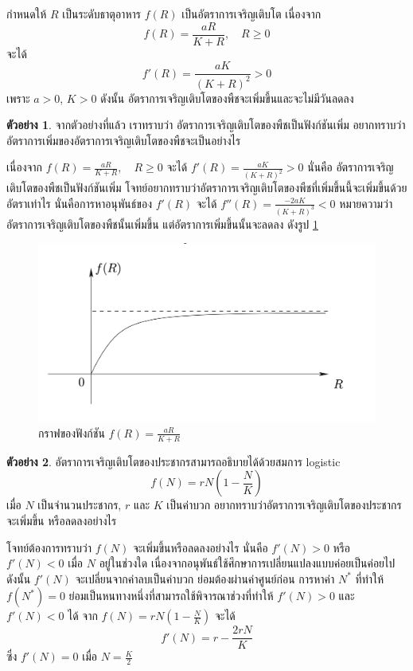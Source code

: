 \documentclass[
]{book}
\theoremstyle{definition}
\theoremstyle{definition}
\newtheorem{example}{ตัวอย่าง}[chapter]
\theoremstyle{definition}
\theoremstyle{definition}
\theoremstyle{remark}
\begin{document}
กำหนดให้ \(R\) เป็นระดับธาตุอาหาร \(f(R)\) เป็นอัตราการเจริญเติบโต เนื่องจาก
\[f(R)=\frac{aR}{K+R},  \quad      R \ge 0\] จะได้
\[f'(R)=\frac{aK}{(K+R)^2}>0\] เพราะ \(a>0\), \(K>0\) ดังนั้น
อัตราการเจริญเติบโตของพืชจะเพิ่มขึ้นและจะไม่มีวันลดลง

\begin{example}
จากตัวอย่างที่แล้ว เราทราบว่า อัตราการเจริญเติบโตของพืชเป็นฟังก์ชันเพิ่ม
อยากทราบว่าอัตราการเพิ่มของอัตราการเจริญเติบโตของพืชจะเป็นอย่างไร
\end{example}

เนื่องจาก \(\displaystyle f(R)=\frac{aR}{K+R}, \quad R \ge 0\) จะได้
\(\displaystyle f'(R)=\frac{aK}{(K+R)^2}>0\) นั่นคือ
อัตราการเจริญเติบโตของพืชเป็นฟังก์ชันเพิ่ม
โจทย์อยากทราบว่าอัตราการเจริญเติบโตของพืชที่เพิ่มขึ้นนี้จะเพิ่มขึ้นด้วยอัตราเท่าไร
นั่นคือการหาอนุพันธ์ของ \(f'(R)\) จะได้
\(\displaystyle f''(R)=\frac{-2aK}{(K+R)^3}<0\)
หมายความว่าอัตราการเจริญเติบโตของพืชนั้นเพิ่มขึ้น แต่อัตราการเพิ่มขึ้นนั้นจะลดลง ดังรูป
\ref{fig:graph7}

\begin{figure}

{\centering \includegraphics[width=0.5\linewidth]{images/graph7} 

}

\caption{กราฟของฟังก์ชัน $f(R)=\frac{aR}{K+R}$}\label{fig:graph7}
\end{figure}

\begin{example}
อัตราการเจริญเติบโตของประชากรสามารถอธิบายได้ด้วยสมการ logistic
\[f(N)=rN(1- \frac{N}{K})\] เมื่อ \(N\) เป็นจำนวนประชากร, \(r\) และ \(K\)
เป็นค่าบวก อยากทราบว่าอัตราการเจริญเติบโตของประชากรจะเพิ่มขึ้น หรือลดลงอย่างไร
\end{example}

โจทย์ต้องการทราบว่า \(f(N)\) จะเพิ่มขึ้นหรือลดลงอย่างไร นั่นคือ \(f'(N)>0\) หรือ
\(f'(N)<0\) เมื่อ \(N\) อยู่ในช่วงใด เนื่องจากอนุพันธ์ใช้ศึกษาการเปลี่ยนแปลงแบบค่อยเป็นค่อยไป
ดังนั้น \(f'(N)\) จะเปลี่ยนจากค่าลบเป็นค่าบวก ย่อมต้องผ่านค่าศูนย์ก่อน การหาค่า \(N^*\)
ที่ทำให้ \(f(N^*)=0\) ย่อมเป็นหนทางหนึ่งที่สามารถใช้พิจารณาช่วงที่ทำให้ \(f'(N)>0\) และ
\(f'(N)<0\) ได้ จาก \(\displaystyle f(N)=rN(1- \frac{N}{K})\) จะได้
\[f'(N)=r- \frac{2rN}{K}\] ซึ่ง \(f'(N)=0\) เมื่อ \(N = \frac{K}{2}\)
\end{document}
